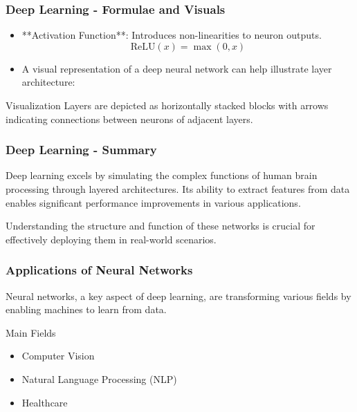 \documentclass{beamer}
\begin{document}
\begin{frame}[fragile]
    \frametitle{Deep Learning - Formulae and Visuals}
    \begin{itemize}
        \item **Activation Function**: Introduces non-linearities to neuron outputs.
        \begin{equation}
            \text{ReLU}(x) = \max(0, x)
        \end{equation}
        \item A visual representation of a deep neural network can help illustrate layer architecture:
    \end{itemize}
    \begin{block}{Visualization}
    Layers are depicted as horizontally stacked blocks with arrows indicating connections between neurons of adjacent layers.
    \end{block}
\end{frame}

\begin{frame}[fragile]
    \frametitle{Deep Learning - Summary}
    Deep learning excels by simulating the complex functions of human brain processing through layered architectures.
    Its ability to extract features from data enables significant performance improvements in various applications.
    
    Understanding the structure and function of these networks is crucial for effectively deploying them in real-world scenarios.
\end{frame}

\begin{frame}[fragile]
    \frametitle{Applications of Neural Networks}
    Neural networks, a key aspect of deep learning, are transforming various fields by enabling machines to learn from data. 
    \begin{block}{Main Fields}
        \begin{itemize}
            \item Computer Vision
            \item Natural Language Processing (NLP)
            \item Healthcare
        \end{itemize}
    \end{block}
\end{frame}
\end{document}
